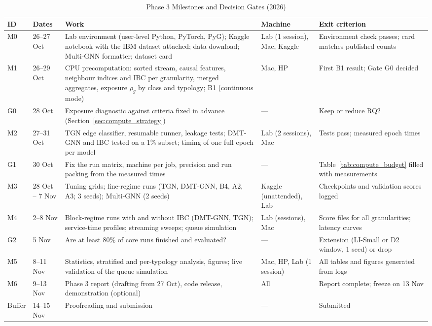 \documentclass[11pt,a4paper]{article}
\begin{document}
\begin{table}[htbp]
\centering
\scriptsize
\caption{Phase 3 Milestones and Decision Gates (2026)}
\label{tab:phase3_plan}
\begin{tabularx}{\textwidth}{L{0.8cm} L{1.4cm} X L{2.0cm} L{3.0cm}}
\toprule
\textbf{ID} & \textbf{Dates} & \textbf{Work} & \textbf{Machine} & \textbf{Exit criterion} \\
\midrule
M0 & 26--27 Oct & Lab environment (user-level Python, PyTorch, PyG); Kaggle notebook with the IBM dataset attached; data download; Multi-GNN formatter; dataset card & Lab (1 session), Mac, Kaggle & Environment check passes; card matches published counts \\
\midrule
M1 & 26--29 Oct & CPU precomputation: sorted stream, causal features, neighbour indices and IBC per granularity, merged aggregates, exposure $\rho_g$ by class and typology; B1 (continuous mode) & Mac, HP & First B1 result; Gate G0 decided \\
\midrule
G0 & 28 Oct & Exposure diagnostic against criteria fixed in advance (Section~\ref{sec:compute_strategy}) & --- & Keep or reduce RQ2 \\
\midrule
M2 & 27--31 Oct & TGN edge classifier, resumable runner, leakage tests; DMT-GNN and IBC tested on a 1\% subset; timing of one full epoch per model & Lab (2 sessions), Mac & Tests pass; measured epoch times \\
\midrule
G1 & 30 Oct & Fix the run matrix, machine per job, precision and run packing from the measured times & --- & Table~\ref{tab:compute_budget} filled with measurements \\
\midrule
M3 & 28 Oct -- 7 Nov & Tuning grids; fine-regime runs (TGN, DMT-GNN, B4, A2, A3; 3 seeds); Multi-GNN (2 seeds) & Kaggle (unattended), Lab & Checkpoints and validation scores logged \\
\midrule
M4 & 2--8 Nov & Block-regime runs with and without IBC (DMT-GNN, TGN); service-time profiles; streaming sweeps; queue simulation & Lab (sessions), Mac & Score files for all granularities; latency curves \\
\midrule
G2 & 5 Nov & Are at least 80\% of core runs finished and evaluated? & --- & Extension (LI-Small or D2 window, 1 seed) or drop \\
\midrule
M5 & 8--11 Nov & Statistics, stratified and per-typology analysis, figures; live validation of the queue simulation & Mac, HP, Lab (1 session) & All tables and figures generated from logs \\
\midrule
M6 & 9--13 Nov & Phase 3 report (drafting from 27 Oct), code release, demonstration (optional) & All & Report complete; freeze on 13 Nov \\
\midrule
Buffer & 14--15 Nov & Proofreading and submission & --- & Submitted \\
\bottomrule
\end{tabularx}
\end{table}
\end{document}
